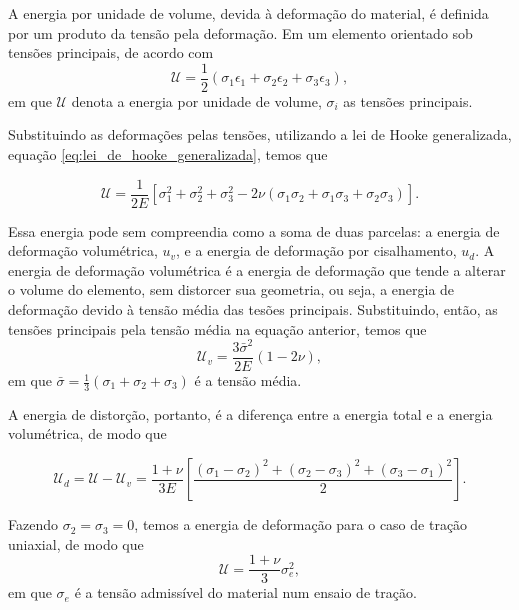 A energia por unidade de volume, devida à deformação do material, é definida por um produto da tensão pela deformação. Em um elemento orientado sob tensões principais, de acordo com \cite{Hibbeler}
\begin{equation}
    \mathcal{U} = \frac{1}{2} (\sigma_1 \epsilon_1 + \sigma_2 \epsilon_2 + \sigma_3 \epsilon_3),
\end{equation}
em que $\mathcal{U}$ denota a energia por unidade de volume, $\sigma_i$ as tensões principais.

Substituindo as deformações pelas tensões, utilizando a lei de Hooke generalizada, equação \ref{eq:lei_de_hooke_generalizada}, temos que

\begin{equation}
    \mathcal{U} = \frac{1}{2E} \left[ \sigma_1^2 + \sigma_2^2 + \sigma_3^2 - 2\nu(\sigma_1\sigma_2 + \sigma_1\sigma_3 + \sigma_2 \sigma_3) \right].
    \label{eq:energia_deformacao}
\end{equation}

Essa energia pode sem compreendia como a soma de duas parcelas: a energia de deformação volumétrica, $u_v$, e a energia de deformação por cisalhamento, $u_d$. A energia de deformação volumétrica é a energia de deformação que tende a alterar o volume do elemento, sem distorcer sua geometria, ou seja, a energia de deformação devido à tensão média das tesões principais. Substituindo, então, as tensões principais pela tensão média na equação anterior, temos que
\begin{equation}
    \mathcal{U}_v = \frac{3\bar{\sigma}^2}{2E} (1 - 2\nu),
    \label{eq:energia_deformacao_volumetrica}
\end{equation}
em que $\bar{\sigma} = \frac{1}{3} (\sigma_1 + \sigma_2 + \sigma_3)$ é a tensão média. 

A energia de distorção, portanto, é a diferença entre a energia total e a energia volumétrica, de modo que

\begin{equation}
    \mathcal{U}_d = \mathcal{U} - \mathcal{U}_v = \frac{1 +\nu}{3E} \left[\frac{(\sigma_1 - \sigma_2)^2 + (\sigma_2 - \sigma_3)^2 + (\sigma_3 - \sigma_1)^2}{2} \right].
    \label{eq:energia_deformacao_distorcao}    
\end{equation}

Fazendo $\sigma_2 = \sigma_3 = 0$, temos a energia de deformação para o caso de tração uniaxial, de modo que
\begin{equation}
    \mathcal{U} = \frac{1 + \nu}{3}\sigma_e^2,
\end{equation}
em que $\sigma_e$ é a tensão admissível do material num ensaio de tração. \cite{Hibbeler}

